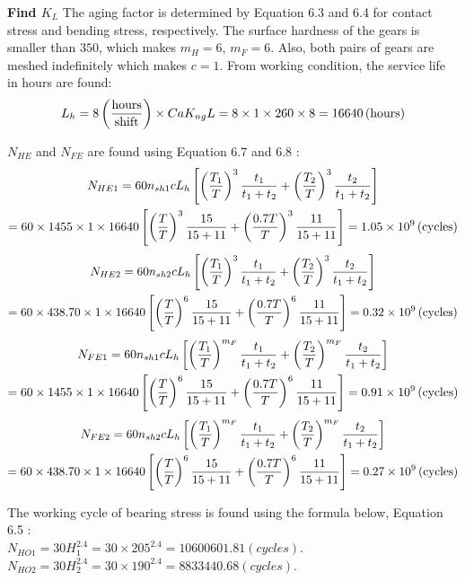 \textbf{Find $ K_L $} The aging factor is determined by Equation 6.3 and 6.4 \cite{tk1} for contact stress and bending stress, respectively. The surface hardness of the gears is smaller than $ 350 $, which makes $ m_H=6 $, $ m_F=6 $. Also, both pairs of gears are meshed indefinitely which makes $ c=1 $. From working condition, the service life in hours are found:
\[L_h = 8\, \mathrm{\left( \dfrac{hours}{shift}\right)}\times Ca  K_{ng} L= 8 \times 1\times 260\times 8 = 16640\, (\mathrm{hours})\]

$ N_{HE} $ and $ N_{FE} $ are found using Equation 6.7 and 6.8 \cite{tk1}:
\begin{multline*}
N_{HE1} = 60n_{sh1}cL_h\left[ \left( \dfrac{T_1}{T}\right)^3\dfrac{t_1}{t_1+t_2} + \left( \dfrac{T_2}{T}\right)^3\dfrac{t_2}{t_1+t_2}\right] \\
= 60 \times 1455 \times 1 \times 16640 \left[ \left( \dfrac{T}{T}\right)^3\dfrac{15}{15+11} + \left( \dfrac{0.7T}{T}\right)^3\dfrac{11}{15+11}\right] = 1.05 \times10^9\, (\mathrm{cycles})
\end{multline*}
\begin{multline*}
N_{HE2} = 60n_{sh2}cL_h\left[ \left( \dfrac{T_1}{T}\right)^3\dfrac{t_1}{t_1+t_2} + \left( \dfrac{T_2}{T}\right)^3\dfrac{t_2}{t_1+t_2}\right]\\
= 60 \times 438.70 \times 1 \times 16640 \left[ \left( \dfrac{T}{T}\right)^6\dfrac{15}{15+11} + \left( \dfrac{0.7T}{T}\right)^6\dfrac{11}{15+11}\right] = 0.32 \times10^9\, (\mathrm{cycles})
\end{multline*}
\begin{multline*}
N_{FE1} = 60n_{sh1}cL_h\left[ \left( \dfrac{T_1}{T}\right)^{m_F}\dfrac{t_1}{t_1+t_2} + \left( \dfrac{T_2}{T}\right)^{m_F}\dfrac{t_2}{t_1+t_2}\right] \\
= 60 \times 1455 \times 1 \times 16640 \left[ \left( \dfrac{T}{T}\right)^6\dfrac{15}{15+11} + \left( \dfrac{0.7T}{T}\right)^6\dfrac{11}{15+11}\right] = 0.91 \times10^9\, (\mathrm{cycles})
\end{multline*}
\begin{multline*} 
N_{FE2} = 60n_{sh2}cL_h\left[ \left( \dfrac{T_1}{T}\right)^{m_F}\dfrac{t_1}{t_1+t_2} + \left( \dfrac{T_2}{T}\right)^{m_F}\dfrac{t_2}{t_1+t_2}\right]\\
= 60 \times 438.70 \times 1 \times 16640 \left[ \left( \dfrac{T}{T}\right)^6\dfrac{15}{15+11} + \left( \dfrac{0.7T}{T}\right)^6\dfrac{11}{15+11}\right] = 0.27 \times10^9\, (\mathrm{cycles})
\end{multline*}

The working cycle of bearing stress is found using the formula below, Equation 6.5 \cite{tk1}:\\
$ N_{HO1} = 30H_1^{2.4} = 30\times 205^{2.4} = 10600601.81\unit{(cycles)}$.\\
$ N_{HO2} = 30H_2^{2.4} = 30\times 190^{2.4} = 8833440.68\unit{(cycles)}$.

